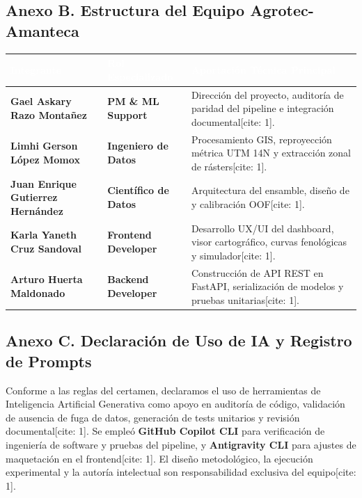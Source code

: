 \documentclass[11pt,a4paper]{article}
\newcommand{\code}[1]{\tcbox[on line, boxsep=1pt, left=3pt, right=3pt, top=1pt, bottom=1pt, colback=mintsoft, colframe=mintsoft, arc=2pt]{\texttt{\footnotesize\color{forestdeep}#1}}}
\begin{document}
\subsection{Anexo B. Estructura del Equipo Agrotec-Amanteca}
\begin{table}[H]
\centering
\footnotesize
\sffamily
\renewcommand{\arraystretch}{1.22}
\begin{tabularx}{\textwidth}{>{\bfseries\color{forestdeep}}l >{\color{emeraldmid}\bfseries}l X}
\toprule
\rowcolor{forestdeep}
\textcolor{white}{Integrante} & \textcolor{white}{Rol Especializado} & \textcolor{white}{Aportación Técnica Principal} \\
\midrule
Gael Askary Razo Montañez & PM \& ML Support & Dirección del proyecto, auditoría de paridad del pipeline e integración documental[cite: 1]. \\
\rowcolor{surfacebg}
Limhi Gerson López Momox & Ingeniero de Datos & Procesamiento GIS, reproyección métrica UTM 14N y extracción zonal de rásters[cite: 1]. \\
Juan Enrique Gutierrez Hernández & Científico de Datos & Arquitectura del ensamble, diseño de \code{LeakFreeSmartPearsonIDW} y calibración OOF[cite: 1]. \\
\rowcolor{surfacebg}
Karla Yaneth Cruz Sandoval & Frontend Developer & Desarrollo UX/UI del dashboard, visor cartográfico, curvas fenológicas y simulador[cite: 1]. \\
Arturo Huerta Maldonado & Backend Developer & Construcción de API REST en FastAPI, serialización de modelos y pruebas unitarias[cite: 1]. \\
\bottomrule
\end{tabularx}
\end{table}

\subsection{Anexo C. Declaración de Uso de IA y Registro de Prompts}
Conforme a las reglas del certamen, declaramos el uso de herramientas de Inteligencia Artificial Generativa como apoyo en auditoría de código, validación de ausencia de fuga de datos, generación de tests unitarios y revisión documental[cite: 1]. Se empleó \textbf{GitHub Copilot CLI} para verificación de ingeniería de software y pruebas del pipeline, y \textbf{Antigravity CLI} para ajustes de maquetación en el frontend[cite: 1]. El diseño metodológico, la ejecución experimental y la autoría intelectual son responsabilidad exclusiva del equipo[cite: 1].
\end{document}
